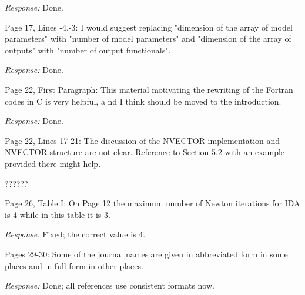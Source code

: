 \documentclass[12pt]{letter}
\begin{document}
{\em Response:} Done.

Page 17, Lines -4,-3: I would suggest replacing "dimension of the array
of model parameters" with "number of model parameters" and "dimension of
the array of outputs" with "number of output functionals".

{\em Response:} Done.

Page 22, First Paragraph: This material motivating the rewriting of
the Fortran codes in C is very helpful, a nd I think should be moved
to the introduction.

{\em Response: } Done.

Page 22, Lines 17-21: The discussion of the NVECTOR implementation and
NVECTOR structure are not clear.  Reference to Section 5.2 with an
example provided there might help.

??????

Page 26, Table I: On Page 12 the maximum number of Newton iterations
for IDA is 4 while in this table it is 3.

{\em Response:} Fixed; the correct value is 4.

Pages 29-30: Some of the journal names are given in abbreviated form
in some places and in full form in other places.

{\em Response:} Done; all references use consistent formats now.
\end{document}

